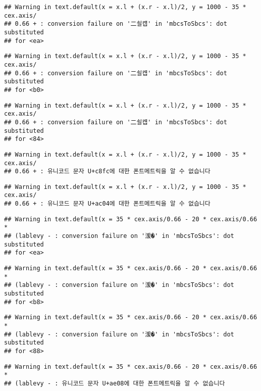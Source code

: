 \documentclass[]{article}
\begin{document}
\begin{verbatim}
## Warning in text.default(x = x.l + (x.r - x.l)/2, y = 1000 - 35 * cex.axis/
## 0.66 + : conversion failure on '二쇨컙' in 'mbcsToSbcs': dot substituted
## for <ea>
\end{verbatim}

\begin{verbatim}
## Warning in text.default(x = x.l + (x.r - x.l)/2, y = 1000 - 35 * cex.axis/
## 0.66 + : conversion failure on '二쇨컙' in 'mbcsToSbcs': dot substituted
## for <b0>
\end{verbatim}

\begin{verbatim}
## Warning in text.default(x = x.l + (x.r - x.l)/2, y = 1000 - 35 * cex.axis/
## 0.66 + : conversion failure on '二쇨컙' in 'mbcsToSbcs': dot substituted
## for <84>
\end{verbatim}

\begin{verbatim}
## Warning in text.default(x = x.l + (x.r - x.l)/2, y = 1000 - 35 * cex.axis/
## 0.66 + : 유니코드 문자 U+c8fc에 대한 폰트메트릭을 알 수 없습니다
\end{verbatim}

\begin{verbatim}
## Warning in text.default(x = x.l + (x.r - x.l)/2, y = 1000 - 35 * cex.axis/
## 0.66 + : 유니코드 문자 U+ac04에 대한 폰트메트릭을 알 수 없습니다
\end{verbatim}

\begin{verbatim}
## Warning in text.default(x = 35 * cex.axis/0.66 - 20 * cex.axis/0.66 *
## (lablevy - : conversion failure on '湲�' in 'mbcsToSbcs': dot substituted
## for <ea>
\end{verbatim}

\begin{verbatim}
## Warning in text.default(x = 35 * cex.axis/0.66 - 20 * cex.axis/0.66 *
## (lablevy - : conversion failure on '湲�' in 'mbcsToSbcs': dot substituted
## for <b8>
\end{verbatim}

\begin{verbatim}
## Warning in text.default(x = 35 * cex.axis/0.66 - 20 * cex.axis/0.66 *
## (lablevy - : conversion failure on '湲�' in 'mbcsToSbcs': dot substituted
## for <88>
\end{verbatim}

\begin{verbatim}
## Warning in text.default(x = 35 * cex.axis/0.66 - 20 * cex.axis/0.66 *
## (lablevy - : 유니코드 문자 U+ae08에 대한 폰트메트릭을 알 수 없습니다
\end{verbatim}
\end{document}

